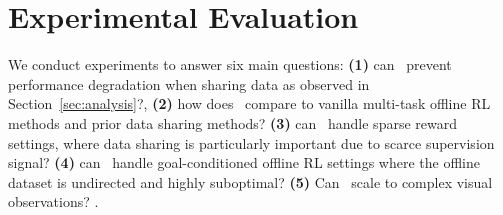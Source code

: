 \section{Experimental Evaluation}
\label{sec:exp}

We conduct experiments to answer six main questions: \textbf{(1)} can \cdsmethodname\ prevent performance degradation when sharing data as observed in Section~\ref{sec:analysis}?, \textbf{(2)} how does \cdsmethodname\ compare to vanilla multi-task offline RL methods and prior data sharing methods?
\textbf{(3)} can \cdsmethodname\ handle sparse reward settings, where data sharing is particularly important due to scarce supervision signal? \textbf{(4)} can \cdsmethodname\ handle goal-conditioned offline RL settings where the offline dataset is undirected and highly suboptimal? \textbf{(5)} Can \cdsmethodname\ scale to complex visual observations? .

